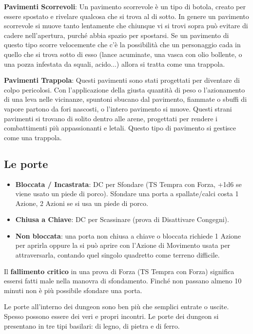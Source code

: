 \begin{multicols}{2}
\textbf{Pavimenti Scorrevoli}: Un pavimento scorrevole è un tipo di botola, creato per essere spostato e rivelare qualcosa che si trova al di sotto. In genere un pavimento scorrevole si muove tanto lentamente che chiunque vi si trovi sopra può evitare di cadere nell'apertura, purché abbia spazio per spostarsi. Se un pavimento di questo tipo scorre velocemente che c'è la possibilità che un personaggio cada in quello che si trova sotto di esso (lance acuminate, una vasca con olio bollente, o una pozza infestata da squali, acido...) allora si tratta come una trappola.

\textbf{Pavimenti Trappola}: Questi pavimenti sono stati progettati per diventare di colpo pericolosi. Con l'applicazione della giusta quantità di peso o l'azionamento di una leva nelle vicinanze, spuntoni sbucano dal pavimento, fiammate o sbuffi di vapore partono da fori nascosti, o l'intero pavimento si muove. Questi strani pavimenti si trovano di solito dentro alle arene, progettati per rendere i combattimenti più appassionanti e letali. Questo tipo di pavimento si gestisce come una trappola.

\subsection{Le porte}

\noindent\begin{itemize}[leftmargin=*] \setlength{\itemsep}{0pt}
\item \textbf{Bloccata / Incastrata}: DC per Sfondare (TS Tempra con Forza, +1d6 se viene usato un piede di porco). Sfondare una porta a spallate/calci costa 1 Azione, 2 Azioni se si usa un piede di porco.
\item \textbf{Chiusa a Chiave}: DC per Scassinare (prova di Disattivare Congegni).
\item \textbf{Non bloccata}: una porta non chiusa a chiave o bloccata richiede 1 Azione per aprirla oppure la si può aprire con l'Azione di Movimento usata per attraversarla, contando quel singolo quadretto come terreno difficile.
\end{itemize}

\medskip

Il \textbf{fallimento critico} in una prova di Forza (TS Tempra con Forza) significa essersi fatti male nella manovra di sfondamento. Finché non passano almeno 10 minuti non è più possibile sfondare una porta.

Le porte all'interno dei dungeon sono ben più che semplici entrate o uscite. Spesso possono essere dei veri e propri incontri. Le porte dei dungeon si presentano in tre tipi basilari: di legno, di pietra e di ferro.

\end{multicols}

